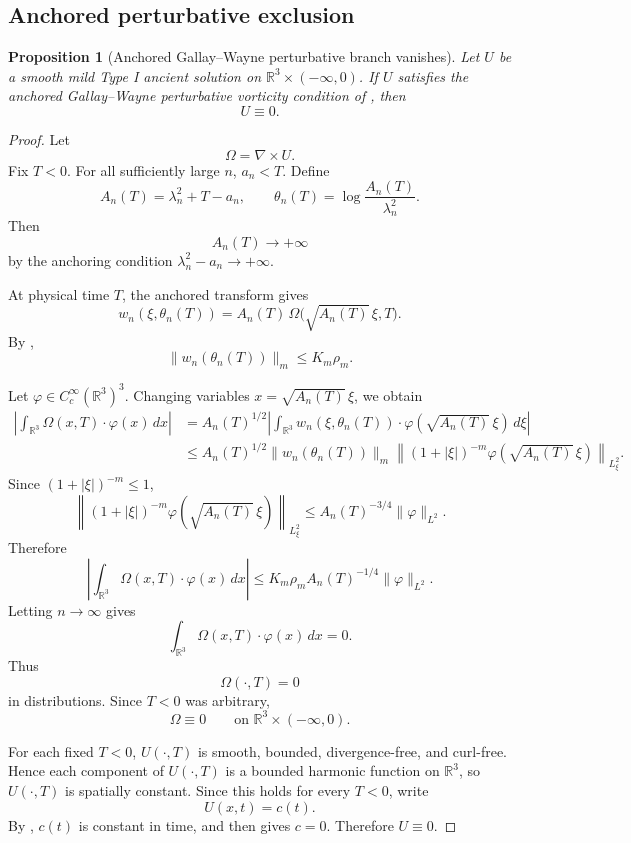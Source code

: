 \documentclass[11pt]{amsart}
\theoremstyle{plain}
\newtheorem{proposition}[proposition]{Proposition}
\theoremstyle{definition}
\theoremstyle{remark}
\numberwithin{equation}{section}
\begin{document}
\subsection{Anchored perturbative exclusion}

\begin{proposition}[Anchored Gallay--Wayne perturbative branch vanishes]
\label{p3:prop:gw-anchored-typeI-zero}
Let \(U\) be a smooth mild Type I ancient solution on
\(\mathbb R^3\times(-\infty,0)\).  If \(U\) satisfies the anchored
Gallay--Wayne perturbative vorticity condition of
, then
\[
   U\equiv0.
\]
\end{proposition}

\begin{proof}
Let
\[
   \Omega=\nabla\times U .
\]
Fix \(T<0\).  For all sufficiently large \(n\), \(a_n<T\).  Define
\[
   A_n(T)=\lambda_n^2+T-a_n,
   \qquad
   \theta_n(T)=\log\frac{A_n(T)}{\lambda_n^2}.
\]
Then
\[
   A_n(T)\to+\infty
\]
by the anchoring condition \(\lambda_n^2-a_n\to+\infty\).

At physical time \(T\), the anchored transform gives
\[
   w_n(\xi,\theta_n(T))
   =
   A_n(T)\,
   \Omega\bigl(\sqrt{A_n(T)}\,\xi,T\bigr).
\]
By ,
\[
   \|w_n(\theta_n(T))\|_m
   \le
   K_m\rho_m .
\]

Let \(\varphi\in C_c^\infty(\mathbb R^3)^3\).  Changing variables
\(x=\sqrt{A_n(T)}\,\xi\), we obtain
\[
\begin{aligned}
   \left|\int_{\mathbb R^3}\Omega(x,T)\cdot\varphi(x)\,dx\right|
   &=
   A_n(T)^{1/2}
   \left|
      \int_{\mathbb R^3}
      w_n(\xi,\theta_n(T))
      \cdot
      \varphi(\sqrt{A_n(T)}\,\xi)
      \,d\xi
   \right|  \\
   &\le
   A_n(T)^{1/2}
   \|w_n(\theta_n(T))\|_m
   \left\|
      (1+|\xi|)^{-m}
      \varphi(\sqrt{A_n(T)}\,\xi)
   \right\|_{L^2_\xi}.
\end{aligned}
\]
Since \((1+|\xi|)^{-m}\le1\),
\[
   \left\|
      (1+|\xi|)^{-m}
      \varphi(\sqrt{A_n(T)}\,\xi)
   \right\|_{L^2_\xi}
   \le
   A_n(T)^{-3/4}\|\varphi\|_{L^2}.
\]
Therefore
\[
   \left|\int_{\mathbb R^3}\Omega(x,T)\cdot\varphi(x)\,dx\right|
   \le
   K_m\rho_m
   A_n(T)^{-1/4}
   \|\varphi\|_{L^2}.
\]
Letting \(n\to\infty\) gives
\[
   \int_{\mathbb R^3}\Omega(x,T)\cdot\varphi(x)\,dx=0.
\]
Thus
\[
   \Omega(\cdot,T)=0
\]
in distributions.  Since \(T<0\) was arbitrary,
\[
   \Omega\equiv0
   \qquad
   \text{on }\mathbb R^3\times(-\infty,0).
\]

For each fixed \(T<0\), \(U(\cdot,T)\) is smooth, bounded, divergence-free,
and curl-free.  Hence each component of \(U(\cdot,T)\) is a bounded harmonic
function on \(\mathbb R^3\), so \(U(\cdot,T)\) is spatially constant.  Since
this holds for every \(T<0\), write
\[
   U(x,t)=c(t).
\]
By , \(c(t)\) is constant in time, and
then  gives \(c=0\).  Therefore
\(U\equiv0\).
\end{proof}
\end{document}
